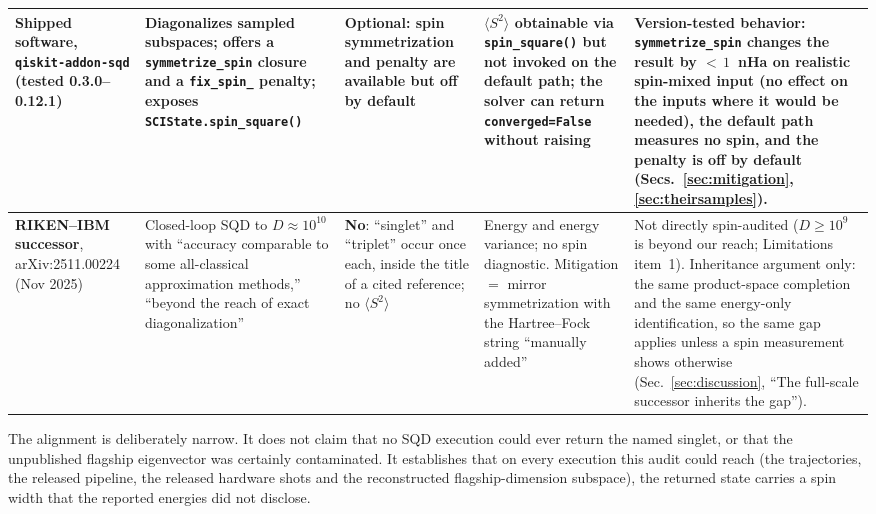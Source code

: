 \documentclass[11pt]{article}
\newcommand{\ssq}{\ensuremath{\langle S^2\rangle}}
\begin{document}
\begin{table}[!ht]
\begin{tabular}{p{2.6cm}p{3.4cm}p{2.1cm}p{2.4cm}p{3.5cm}}
\midrule
\textbf{Shipped software}, \texttt{qiskit-\allowbreak addon-\allowbreak sqd} (tested 0.3.0--0.12.1) & Diagonalizes sampled subspaces; offers a \texttt{symmetrize\_spin} closure and a \texttt{fix\_spin\_} penalty; exposes \texttt{SCIState.\allowbreak spin\_square()} & Optional: spin symmetrization and penalty are available but \textbf{off by default} & \ssq{} obtainable via \texttt{spin\_square()} but not invoked on the default path; the solver can return \texttt{converged=\allowbreak False} without raising & Version-tested behavior: \texttt{symmetrize\_spin} changes the result by ${<}\,1$~nHa on realistic spin-mixed input (no effect on the inputs where it would be needed), the default path measures no spin, and the penalty is off by default (Secs.~\ref{sec:mitigation}, \ref{sec:theirsamples}). \\
\midrule
\textbf{RIKEN--IBM successor}, arXiv:2511.00224 (Nov 2025) & Closed-loop SQD to $D\approx10^{10}$ with ``accuracy comparable to some all-classical approximation methods,'' ``beyond the reach of exact diagonalization'' & \textbf{No}: ``singlet'' and ``triplet'' occur once each, inside the title of a cited reference; no \ssq{} & Energy and energy variance; no spin diagnostic. Mitigation $=$ mirror symmetrization with the Hartree--Fock string ``manually added'' & Not directly spin-audited ($D\ge10^9$ is beyond our reach; Limitations item~1). Inheritance argument only: the same product-space completion and the same energy-only identification, so the same gap applies unless a spin measurement shows otherwise (Sec.~\ref{sec:discussion}, ``The full-scale successor inherits the gap''). \\
\bottomrule
\end{tabular}
\end{table}

The alignment is deliberately narrow. It does not claim that no SQD execution could ever return the named singlet, or that the unpublished flagship eigenvector was certainly contaminated. It establishes that on every execution this audit could reach (the trajectories, the released pipeline, the released hardware shots and the reconstructed flagship-dimension subspace), the returned state carries a spin width that the reported energies did not disclose.
\end{document}
